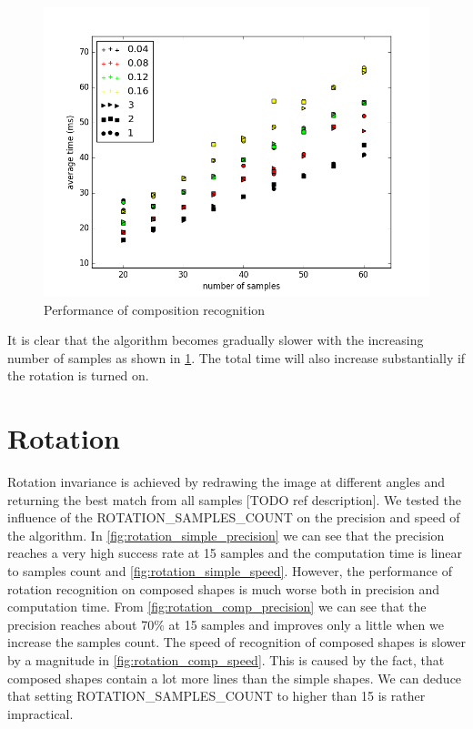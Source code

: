 \begin{description}
\begin{description}
\begin{figure}[!htb]
\centering
\includegraphics[width=.8\linewidth]{ext/figure_composition_speed.png}
\caption{Performance of composition recognition}
\label{fig:com_speed}
\end{figure}

It is clear that the algorithm becomes gradually slower with the increasing number of samples as shown in \cref{fig:com_speed}. The total time will also increase substantially if the rotation is turned on.

\section{Rotation}
Rotation invariance is achieved by redrawing the image at different angles and returning the best match from all samples [TODO ref description]. We tested the influence of the ROTATION\_SAMPLES\_COUNT on the precision and speed of the algorithm. In \cref{fig:rotation_simple_precision} we can see that the precision reaches a very high success rate at 15 samples and the computation time is linear to samples count and  \cref{fig:rotation_simple_speed}. However, the performance of rotation recognition on composed shapes is much worse both in precision and computation time. From \cref{fig:rotation_comp_precision} we can see that the precision reaches about 70\% at 15 samples and improves only a little when we increase the samples count. The speed of recognition of composed shapes is slower by a magnitude in \cref{fig:rotation_comp_speed}. This is caused by the fact, that composed shapes contain a lot more lines than the simple shapes. We can deduce that setting ROTATION\_SAMPLES\_COUNT to higher than 15 is rather impractical.


\end{description}
\end{description}
